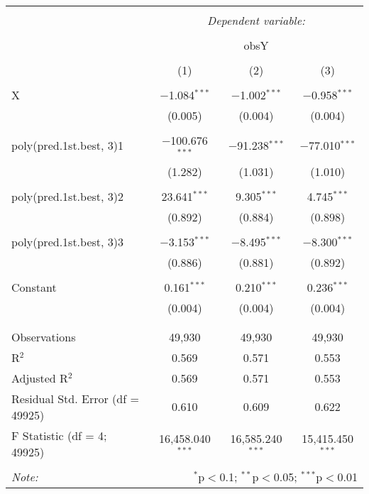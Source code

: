 \documentclass[12pt,english]{article}
\begin{document}
\begin{table}[!htbp] \centering
  \caption{}
  \label{}
\begin{tabular}{@{\extracolsep{5pt}}lccc}
\\[-1.8ex]\hline
\hline \\[-1.8ex]
 & \multicolumn{3}{c}{\textit{Dependent variable:}} \\
\cline{2-4}
\\[-1.8ex] & \multicolumn{3}{c}{obsY} \\
\\[-1.8ex] & (1) & (2) & (3)\\
\hline \\[-1.8ex]
 X & $-$1.084$^{***}$ & $-$1.002$^{***}$ & $-$0.958$^{***}$ \\
  & (0.005) & (0.004) & (0.004) \\
  & & & \\
 poly(pred.1st.best, 3)1 & $-$100.676$^{***}$ & $-$91.238$^{***}$ & $-$77.010$^{***}$ \\
  & (1.282) & (1.031) & (1.010) \\
  & & & \\
 poly(pred.1st.best, 3)2 & 23.641$^{***}$ & 9.305$^{***}$ & 4.745$^{***}$ \\
  & (0.892) & (0.884) & (0.898) \\
  & & & \\
 poly(pred.1st.best, 3)3 & $-$3.153$^{***}$ & $-$8.495$^{***}$ & $-$8.300$^{***}$ \\
  & (0.886) & (0.881) & (0.892) \\
  & & & \\
 Constant & 0.161$^{***}$ & 0.210$^{***}$ & 0.236$^{***}$ \\
  & (0.004) & (0.004) & (0.004) \\
  & & & \\
\hline \\[-1.8ex]
Observations & 49,930 & 49,930 & 49,930 \\
R$^{2}$ & 0.569 & 0.571 & 0.553 \\
Adjusted R$^{2}$ & 0.569 & 0.571 & 0.553 \\
Residual Std. Error (df = 49925) & 0.610 & 0.609 & 0.622 \\
F Statistic (df = 4; 49925) & 16,458.040$^{***}$ & 16,585.240$^{***}$ & 15,415.450$^{***}$ \\
\hline
\hline \\[-1.8ex]
\textit{Note:}  & \multicolumn{3}{r}{$^{*}$p$<$0.1; $^{**}$p$<$0.05; $^{***}$p$<$0.01} \\
\end{tabular}
\end{table}
\end{document}
